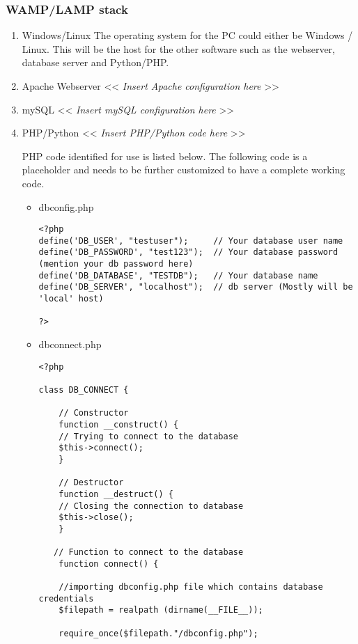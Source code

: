 \documentclass[a4paper,oneside]{article}
\begin{document}
\subsubsection{WAMP/LAMP stack}
\label{sec:org5c40965}
\begin{enumerate}
\item Windows/Linux
\label{sec:org9c1cd6c}
The operating system for the PC could either be Windows / Linux. This
will be the host for the other software such as the webserver,
database server and Python/PHP.
\item Apache Webserver
\label{sec:orgecd09b0}
<< \emph{Insert Apache configuration here} >>
\item mySQL
\label{sec:org87851f7}
<< \emph{Insert mySQL configuration here} >>
\item PHP/Python
\label{sec:org5809311}
<< \emph{Insert PHP/Python code here} >> 

PHP code identified for use is listed below. The following code is a
placeholder and needs to be further customized to have a complete
working code.

\begin{itemize}
\item dbconfig.php
\label{sec:orgc95a10a}
\begin{verbatim}
<?php
define('DB_USER', "testuser");     // Your database user name
define('DB_PASSWORD', "test123");  // Your database password (mention your db password here)
define('DB_DATABASE', "TESTDB");   // Your database name
define('DB_SERVER', "localhost");  // db server (Mostly will be 'local' host)

?>
\end{verbatim}

\item dbconnect.php
\label{sec:orged1535f}
\begin{verbatim}
<?php

class DB_CONNECT {

    // Constructor
    function __construct() {
	// Trying to connect to the database
	$this->connect();
    }

    // Destructor
    function __destruct() {
	// Closing the connection to database
	$this->close();
    }

   // Function to connect to the database
    function connect() {

	//importing dbconfig.php file which contains database credentials 
	$filepath = realpath (dirname(__FILE__));

	require_once($filepath."/dbconfig.php");


\end{verbatim}
\end{itemize}
\end{enumerate}
\end{document}
